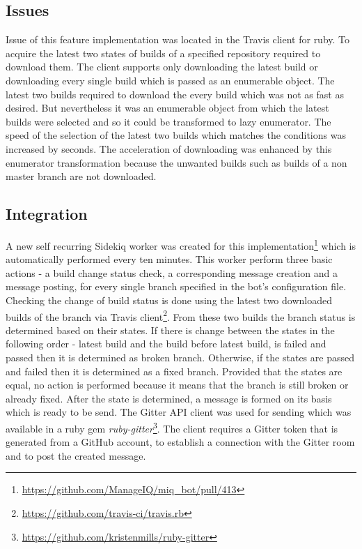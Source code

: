 \subsection{Issues}

Issue of this feature implementation was located in the Travis client for ruby. To acquire the latest two states of builds of a specified repository required to download them. The client supports only downloading the latest build or downloading every single build which is passed as an enumerable object. The latest two builds required to download the every build which was not as fast as desired. But nevertheless it was an enumerable object from which the latest builds were selected and so it could be transformed to lazy enumerator. The speed of the selection of the latest two builds which matches the conditions was increased by seconds. The acceleration of downloading was enhanced by this enumerator transformation because the unwanted builds such as builds of a non master branch are not downloaded.

\subsection{Integration}

A new self recurring Sidekiq worker was created for this implementation\footnote{\url{https://github.com/ManageIQ/miq_bot/pull/413}} which is automatically performed every ten minutes. This worker perform three basic actions - a build change status check, a corresponding message creation and a message posting, for every single branch specified in the bot's configuration file. Checking the change of build status is done using the latest two downloaded builds of the branch via Travis client\footnote{\url{https://github.com/travis-ci/travis.rb}}. From these two builds the branch status is determined based on their states. If there is change between the states in the following order - latest build and the build before latest build, is failed and passed then it is determined as broken branch. Otherwise, if the states are passed and failed then it is determined as a fixed branch. Provided that the states are equal, no action is performed because it means that the branch is still broken or already fixed. After the state is determined, a message is formed on its basis which is ready to be send. The Gitter API client was used for sending which was available in a ruby gem \textit{ruby-gitter}\footnote{\url{https://github.com/kristenmills/ruby-gitter}}. The client requires a Gitter token that is generated from a GitHub account, to establish a connection with the Gitter room and to post the created message.

